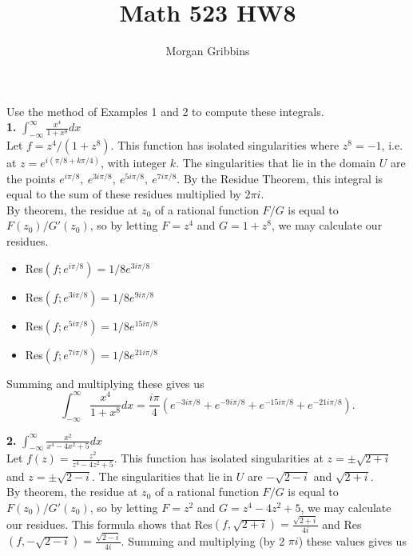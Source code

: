 \documentclass[12pt,letterpaper]{article}
\title{Math 523 HW8}
\author{Morgan Gribbins}
\date{}
\begin{document}
	
\maketitle

Use the method of Examples 1 and 2 to compute these integrals. \\

\textbf{1.} \(\int_{-\infty}^{\infty} \frac{x^{4}}{1+x^{8}}dx\) \\

Let \(f= z^{4}/(1+z^{8})\). This function has isolated singularities where \(z^{8} = -1\), i.e. at \(z = e^{i(\pi/8+k\pi/4)}\), with integer \(k\). The singularities that lie in the domain \(U\) are the points \(e^{i\pi/8},\ e^{3i\pi/8},\ e^{5i\pi/8},\ e^{7i\pi/8}\). By the Residue Theorem, this integral is equal to the sum of these residues multiplied by \(2\pi i\). \\

By theorem, the residue at \(z_{0}\) of a rational function \(F/G\) is equal to \(F(z_{0})/G'(z_{0})\), so by letting \(F=z^{4}\) and \(G=1+z^{8}\), we may calculate our residues.\\
\begin{itemize}
	\item Res\((f; e^{i\pi/8}) = 1/8e^{3i\pi/8}\) \\
	\item Res\((f; e^{3i\pi/8}) = 1/8e^{9i\pi/8}\) \\
	\item Res\((f; e^{5i\pi/8}) = 1/8e^{15i\pi/8}\) \\
	\item Res\((f; e^{7i\pi/8}) = 1/8e^{21i\pi/8}\) \\
\end{itemize}
Summing and multiplying these gives us \[\int_{-\infty}^{\infty} \frac{x^{4}}{1+x^{8}}dx = \frac{i\pi}{4}(e^{-3i\pi/8}+e^{-9i\pi/8}+e^{-15i\pi/8}+e^{-21i\pi/8}).\]

\textbf{2.} \(\int_{-\infty}^{\infty}\frac{x^{2}}{x^{4}-4x^{2}+5}dx\)\\

Let \(f(z) = \frac{z^{2}}{z^{4}-4z^{2}+5}\). This function has isolated singularities at \(z= \pm \sqrt{2+i}\) and \(z=\pm\sqrt{2-i}\). The singularities that lie in \(U\) are \(-\sqrt{2-i}\) and \(\sqrt{2+i}\). \\

By theorem, the residue at \(z_{0}\) of a rational function \(F/G\) is equal to \(F(z_{0})/G'(z_{0})\), so by letting \(F=z^{2}\) and \(G=z^{4}-4z^{2}+5\), we may calculate our residues. This formula shows that Res\((f, \sqrt{2+i}) = \frac{\sqrt{2+i}}{4i}\) and Res\((f, -\sqrt{2-i}) = \frac{\sqrt{2-i}}{4i}\). Summing and multiplying (by 2 \(\pi i\)) these values gives us
\end{document}
